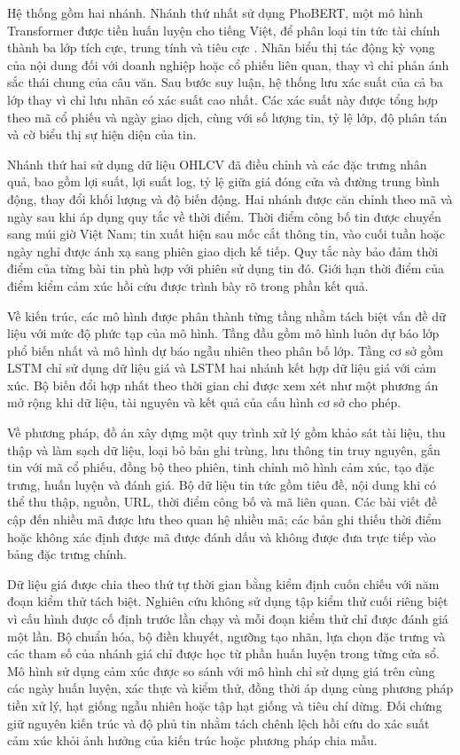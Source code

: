 \documentclass[12pt, a4paper, oneside]{report}
\begin{document}
Hệ thống gồm hai nhánh. Nhánh thứ nhất sử dụng PhoBERT, một mô hình Transformer được
tiền huấn luyện cho tiếng Việt, để phân loại tin tức tài chính thành ba lớp tích cực,
trung tính và tiêu cực \cite{Nguyen2020_200300744v3}. Nhãn biểu thị tác động kỳ vọng của
nội dung đối với doanh nghiệp hoặc cổ phiếu liên quan, thay vì chỉ phản ánh sắc thái
chung của câu văn. Sau bước suy luận, hệ thống lưu xác suất của cả ba lớp thay vì chỉ
lưu nhãn có xác suất cao nhất. Các xác suất này được tổng hợp theo mã cổ phiếu và ngày
giao dịch, cùng với số lượng tin, tỷ lệ lớp, độ phân tán và cờ biểu thị sự hiện diện của
tin.

Nhánh thứ hai sử dụng dữ liệu OHLCV đã điều chỉnh và các đặc trưng nhân quả, bao gồm lợi
suất, lợi suất log, tỷ lệ giữa giá đóng cửa và đường trung bình động, thay đổi khối lượng
và độ biến động. Hai nhánh được căn chỉnh theo mã và ngày sau khi áp dụng quy tắc về thời
điểm. Thời điểm công bố tin được chuyển sang múi giờ Việt Nam; tin xuất hiện sau mốc cắt
thông tin, vào cuối tuần hoặc ngày nghỉ được ánh xạ sang phiên giao dịch kế tiếp. Quy tắc
này bảo đảm thời điểm của từng bài tin phù hợp với phiên sử dụng tin đó. Giới hạn thời
điểm của điểm kiểm cảm xúc hồi cứu được trình bày rõ trong phần kết quả.

Về kiến trúc, các mô hình được phân thành từng tầng nhằm tách biệt vấn đề dữ liệu với
mức độ phức tạp của mô hình. Tầng đầu gồm mô hình luôn dự báo lớp phổ biến nhất và mô
hình dự báo ngẫu nhiên theo phân bố lớp. Tầng cơ sở gồm LSTM chỉ sử dụng dữ liệu giá và
LSTM hai nhánh kết hợp dữ liệu giá với cảm xúc. Bộ biến đổi hợp nhất theo thời gian chỉ
được xem xét như một phương án mở rộng khi dữ liệu, tài nguyên và kết quả của cấu hình
cơ sở cho phép.

Về phương pháp, đồ án xây dựng một quy trình xử lý gồm khảo sát tài liệu, thu thập và làm
sạch dữ liệu, loại bỏ bản ghi trùng, lưu thông tin truy nguyên, gắn tin với mã cổ phiếu,
đồng bộ theo phiên, tinh chỉnh mô hình cảm xúc, tạo đặc trưng, huấn luyện và đánh giá.
Bộ dữ liệu tin tức gồm tiêu đề, nội dung khi có thể thu thập, nguồn, URL, thời điểm công
bố và mã liên quan. Các bài viết đề cập đến nhiều mã được lưu theo quan hệ nhiều mã; các
bản ghi thiếu thời điểm hoặc không xác định được mã được đánh dấu và không được đưa trực
tiếp vào bảng đặc trưng chính.

Dữ liệu giá được chia theo thứ tự thời gian bằng kiểm định cuốn chiếu với năm đoạn kiểm
thử tách biệt. Nghiên cứu không sử dụng tập kiểm thử cuối riêng biệt vì cấu hình được cố
định trước lần chạy và mỗi đoạn kiểm thử chỉ được đánh giá một lần. Bộ chuẩn hóa, bộ điền
khuyết, ngưỡng tạo nhãn, lựa chọn đặc trưng và các tham số của nhánh giá chỉ được học từ
phần huấn luyện trong từng cửa sổ. Mô hình sử dụng cảm xúc được so sánh với mô hình chỉ
sử dụng giá trên cùng các ngày huấn luyện, xác thực và kiểm thử, đồng thời áp dụng cùng
phương pháp tiền xử lý, hạt giống ngẫu nhiên hoặc tập hạt giống và tiêu chí dừng. Đối
chứng giữ nguyên kiến trúc và độ phủ tin nhằm tách chênh lệch hồi cứu do xác suất cảm
xúc khỏi ảnh hưởng của kiến trúc hoặc phương pháp chia mẫu.
\end{document}
